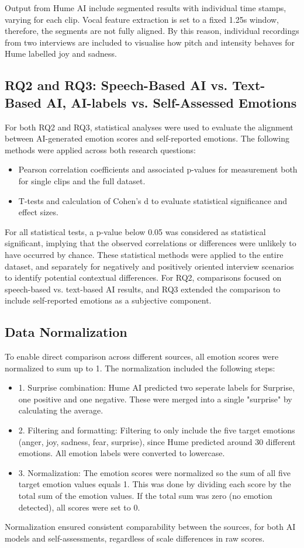 Output from Hume AI include segmented results with individual time stamps, varying for each clip. Vocal feature extraction is set to a fixed 1.25s window, therefore, the segments are not fully aligned. 
By this reason, individual recordings from two interviews are included to visualise how pitch and intensity behaves for Hume labelled joy and sadness. 

\subsection{RQ2 and RQ3: Speech-Based AI vs. Text-Based AI, AI-labels vs. Self-Assessed Emotions}
For both RQ2 and RQ3, statistical analyses were used to evaluate the alignment between AI-generated emotion scores and self-reported emotions. The following methods were applied across both research questions:
\begin{itemize}
    \item Pearson correlation coefficients and associated p-values for measurement both for single clips and the full dataset. 
    \item T-tests and calculation of Cohen's d to evaluate statistical significance and effect sizes. 
\end{itemize}
For all statistical tests, a p-value below 0.05 was considered as statistical significant, implying that the observed correlations or differences were unlikely to have occurred by chance. 
These statistical methods were applied to the entire dataset, and separately for negatively and positively oriented interview scenarios to identify potential contextual differences.
For RQ2, comparisons focused on speech-based vs. text-based AI results, and RQ3 extended the comparison to include self-reported emotions as a subjective component.

\subsection{Data Normalization}
To enable direct comparison across different sources, all emotion scores were normalized to sum up to 1. The normalization included the following steps: 
\begin{itemize}
    \item 1. Surprise combination: Hume AI predicted two seperate labels for Surprise, one positive and one negative. These were merged into a single "surprise" by calculating the average. 
    \item 2. Filtering and formatting: Filtering to only include the five target emotions (anger, joy, sadness, fear, surprise), since Hume predicted around 30 different emotions. All emotion labels were converted to lowercase. 
    \item 3. Normalization: The emotion scores were normalized so the sum of all five target emotion values equals 1. This was done by dividing each score by the total sum of the emotion values. If the total sum was zero (no emotion detected), all scores were set to 0. 
\end{itemize}
Normalization ensured consistent comparability between the sources, for both AI models and self-assessments, regardless of scale differences in raw scores. 
